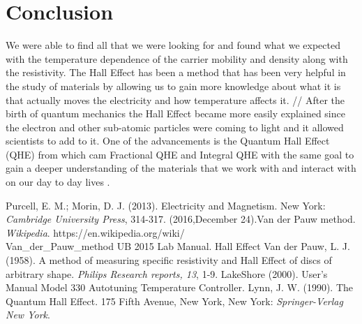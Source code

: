\documentclass[twocolumn]{article}
\begin{document}
\section{Conclusion}
We were able to find all that we were looking for and found what we expected with the 
temperature dependence of the carrier mobility and density along with the 
resistivity. The Hall Effect has been a method that has been very helpful in 
the study of materials by allowing us to gain more knowledge about what it is 
that actually moves the electricity and how temperature affects it. 
//
After the birth of quantum mechanics the Hall Effect became more easily 
explained since the electron and other sub-atomic particles were coming to 
light and it allowed scientists to add to it. One of the advancements is the 
Quantum Hall Effect (QHE) from which cam Fractional QHE and Integral QHE with 
the same goal to gain a deeper understanding of the materials that we work with 
and interact with on our day to day lives \cite{ref:6}.
\begin{thebibliography}{9}
Purcell, E. M.; Morin, D. J. (2013). Electricity and Magnetism. New York: 
\emph{Cambridge University Press}, 314-317.
(2016,December 24).Van der Pauw method. \emph{Wikipedia}. 
https://en.wikipedia.org/wiki/\\Van\_der\_Pauw\_method
UB 2015 Lab Manual. Hall Effect
Van der Pauw, L. J. (1958). A method of measuring specific resistivity and 
Hall Effect of discs of arbitrary shape. \emph{Philips Research reports, 13}, 
1-9.
LakeShore (2000). User's Manual Model 330 Autotuning Temperature Controller.
Lynn, J. W. (1990). The Quantum Hall Effect. 175 Fifth Avenue, New York, 
New York: \emph{Springer-Verlag New York}.
\end{thebibliography}
\end{document}

